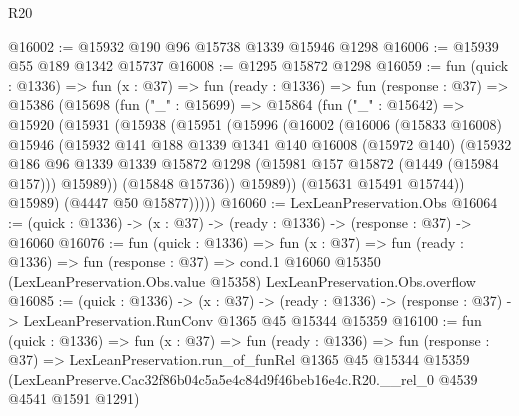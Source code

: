\begin{lexlean}{R20}
\begin{coremodule}
@16002 := @15932 @190 @96 @15738 @1339 @15946 @1298
@16006 := @15939 @55 @189 @1342 @15737
@16008 := @1295 @15872 @1298
@16059 := fun (quick : @1336) =>
  fun (x : @37) =>
  fun (ready : @1336) =>
  fun (response : @37) =>
  @15386
    (@15698
      (fun ("_" : @15699) =>
      @15864
        (fun ("_" : @15642) =>
        @15920
          (@15931
            (@15938
              (@15951
                (@15996
                  (@16002
                    (@16006
                      (@15833 @16008)
                      @15946
                      (@15932
                        @141
                        @188
                        @1339
                        @1341
                        @140
                        @16008
                        (@15972 @140)
                        (@15932
                          @186
                          @96
                          @1339
                          @1339
                          @15872
                          @1298
                          (@15981 @157 @15872 (@1449 (@15984 @157)))
                          @15989))
                      (@15848 @15736))
                    @15989))
                (@15631 @15491 @15744))
              @15989)
            (@4447 @50 @15877)))))
@16060 := LexLeanPreservation.Obs
@16064 := (quick : @1336) -> (x : @37) -> (ready : @1336) -> (response : @37) -> @16060
@16076 := fun (quick : @1336) =>
  fun (x : @37) =>
  fun (ready : @1336) =>
  fun (response : @37) =>
  cond.{1} @16060 @15350 (LexLeanPreservation.Obs.value @15358) LexLeanPreservation.Obs.overflow
@16085 := (quick : @1336) ->
  (x : @37) ->
  (ready : @1336) -> (response : @37) -> LexLeanPreservation.RunConv @1365 @45 @15344 @15359
@16100 := fun (quick : @1336) =>
  fun (x : @37) =>
  fun (ready : @1336) =>
  fun (response : @37) =>
  LexLeanPreservation.run_of_funRel
    @1365
    @45
    @15344
    @15359
    (LexLeanPreserve.Cac32f86b04c5a5e4c84d9f46beb16e4c.R20.__rel_0 @4539 @4541 @1591 @1291)
\end{coremodule}
\end{lexlean}
